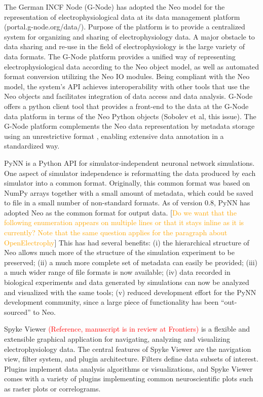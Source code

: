 \documentclass{frontiers}
\newcommand{\missing}[1]{\textcolor{red}{#1}}
\newcommand{\florent}[1]{[\textcolor{Orange}{#1}]}
\begin{document}
The German INCF Node (G-Node) has adopted the Neo model for the representation of electrophysiological data at its data management platform (portal.g-node.org/data/).
Purpose of the platform is to provide a centralized system for organizing and sharing of electrophysiology data.
A major obstacle to data sharing and re-use in the field of electrophysiology is the large variety of data formats.
The G-Node platform provides a unified way of representing electrophysiological data according to the Neo object model, as well as automated format conversion utilizing the Neo IO modules.
Being compliant with the Neo model, the system's API achieves interoperability with other tools that use the Neo objects and facilitates integration of data access and data analysis.
G-Node offers a python client tool that provides a front-end to the data at the G-Node data platform in terms of the Neo Python objects (Sobolev et al, this issue).
The G-Node platform complements the Neo data representation by metadata storage using an unrestrictive format \citep{Grewe2011}, enabling extensive data annotation in a standardized way.


PyNN \citep{Davison2009} is a Python API for simulator-independent neuronal network simulations.
One aspect of simulator independence is reformatting the data produced by each simulator into a common format.
Originally, this common format was based on NumPy arrays together with a small amount of metadata, which could be saved to file in a small number of non-standard formats.
As of version 0.8, PyNN has adopted Neo as the common format for output data.
\florent{Do we want that the following enumeration appears on multiple lines or that it stays inline as it is currently? Note that the same question applies for the paragraph about OpenElectrophy}
This has had several benefits:
  (i)   the hierarchical structure of Neo allows much more of the structure of the simulation experiment to be preserved;
  (ii)  a much more complete set of metadata can easily be provided;
  (iii) a much wider range of file formats is now available;
  (iv)  data recorded in biological experiments and data generated by simulations can now be analyzed and visualized with the same tools; 
  (v)   reduced development effort for the PyNN development community, since a large piece of functionality has been ``out-sourced'' to Neo.

Spyke Viewer \missing{(Reference, manuscript is in review at Frontiers)} is a flexible and extensible graphical application for navigating, analyzing and visualizing electrophysiology data. 
The central features of Spyke Viewer are the navigation view, filter system, and plugin architecture.
Filters define data subsets of interest.
Plugins implement data analysis algorithms or visualizations, and Spyke Viewer comes with a variety of plugins implementing common neuroscientific plots such as raster plots or correlograms.
\end{document}
